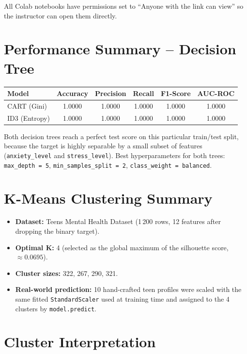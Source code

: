\documentclass[11pt]{article}
\begin{document}
\noindent All Colab notebooks have permissions set to ``Anyone with the link
can view'' so the instructor can open them directly.

\section*{Performance Summary -- Decision Tree}

\begin{center}
\begin{tabular}{lccccc}
\toprule
\textbf{Model} & \textbf{Accuracy} & \textbf{Precision} & \textbf{Recall} & \textbf{F1-Score} & \textbf{AUC-ROC} \\
\midrule
CART (Gini)  & 1.0000 & 1.0000 & 1.0000 & 1.0000 & 1.0000 \\
ID3 (Entropy)& 1.0000 & 1.0000 & 1.0000 & 1.0000 & 1.0000 \\
\bottomrule
\end{tabular}
\end{center}

\noindent Both decision trees reach a perfect test score on this particular
train/test split, because the target is highly separable by a small subset of
features (\texttt{anxiety\_level} and \texttt{stress\_level}). Best
hyperparameters for both trees:
\texttt{max\_depth = 5}, \texttt{min\_samples\_split = 2}, \texttt{class\_weight = balanced}.

\section*{K-Means Clustering Summary}

\begin{itemize}[leftmargin=*]
    \item \textbf{Dataset:} Teens Mental Health Dataset (1\,200 rows, 12 features
        after dropping the binary target).
    \item \textbf{Optimal K:} 4 (selected as the global maximum of the silhouette
        score, $\approx 0.0695$).
    \item \textbf{Cluster sizes:} 322, 267, 290, 321.
    \item \textbf{Real-world prediction:} 10 hand-crafted teen profiles were scaled
        with the same fitted \texttt{StandardScaler} used at training time and
        assigned to the 4 clusters by \texttt{model.predict}.
\end{itemize}

\section*{Cluster Interpretation}
\end{document}
